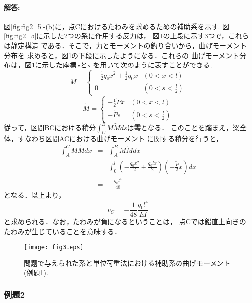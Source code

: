 ﻿\documentclass[10pt,a4j]{jarticle}
\begin{document}
\paragraph{解答:}
図\ref{fig:fig2_5}-(b)に，点Cにおけるたわみを求めるための補助系を示す.
図\ref{fig:fig2_5}に示した2つの系に作用する反力は，
図\ref{fig:fig3}の上段に示す3つで，これらは静定構造
である．そこで，力とモーメントの釣り合いから，曲げモーメント分布を
求めると，図\ref{fig:fig3}の下段に示したようになる．これらの
曲げモーメント分布は，図\ref{fig:fig3}に示した座標$x$と$s$
を用いて次のように表すことができる．
\begin{equation}
	M = \left\{
	\begin{array}{cc}
		-\frac{1}{2}q_0x^2+\frac{1}{2}q_0x & (0<x<l) \\
		0 & \left( 0< s< \frac{l}{2}\right)
	\end{array}
	\right.
	\label{eqn:}
\end{equation}
\begin{equation}
	\tilde M = \left\{
	\begin{array}{cc}
		-\frac{1}{2}\tilde P x & \left( 0<x<l \right) \\
		-\tilde P s & \left( 0< s< \frac{l}{2}\right)
	\end{array}
	\right.
	\label{eqn:}
\end{equation}
従って，区間BCにおける積分$\int_C^B M\tilde Mds$は零となる．
このことを踏まえ，梁全体，すなわち区間ACにおける曲げモーメント
に関する積分を行うと，
\begin{eqnarray}
	\int_A^CM\tilde M dx & = &  \int_A^BM\tilde M dx  \nonumber \\
	&=&
	\int_0^l
	\left(	-\frac{q_0x^2}{2}+\frac{q_0lx}{2}  \right)
	\left(	-\frac{\tilde P}{2}x \right)
	dx \\
	&= & -\frac{q_0l^4}{48}
	\label{eqn:}
\end{eqnarray}
となる．以上より，
\begin{equation}
	v_C=-\frac{1}{48} \frac{q_0l^4}{EI}
	\label{eqn:}
\end{equation}
と求められる．なお，たわみが負になるということは，
点Cでは鉛直上向きのたわみが生じていることを意味する．
\begin{figure}[h]
	\begin{center}
	\texttt{[image: fig3.eps]} 
	\end{center}
	\caption{問題で与えられた系と単位荷重法における補助系の曲げモーメント(例題1).} 
	\label{fig:fig3}
\end{figure}
\subsubsection{例題2}
\end{document}
